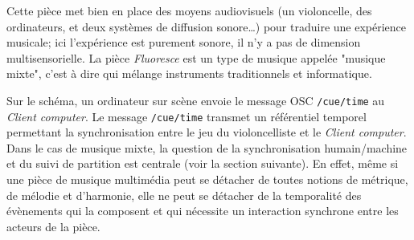 Cette pièce met bien en place des moyens audiovisuels (un violoncelle, des ordinateurs, et deux systèmes de diffusion sonore…) pour traduire une expérience musicale; ici l'expérience est purement sonore, il n'y a pas de dimension multisensorielle. La pièce \textit{Fluoresce} est un type de musique appelée "musique mixte", c'est à dire qui mélange instruments traditionnels et informatique.

Sur le schéma, un ordinateur sur scène envoie le message OSC \texttt{/cue/time} au \textit{Client computer}. Le message \texttt{/cue/time} transmet un référentiel temporel permettant la synchronisation entre le jeu du violoncelliste et le \textit{Client computer}. 
Dans le cas de musique mixte, la question de la synchronisation humain/machine et du suivi de partition est centrale (voir la section suivante). 
En effet, même si une pièce de musique multimédia peut se détacher de toutes notions de métrique, de mélodie et d'harmonie, elle ne peut se détacher de la temporalité des évènements qui la composent et qui nécessite un interaction synchrone entre les acteurs de la pièce. 


